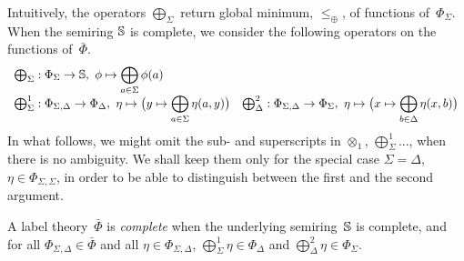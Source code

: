 Intuitively, the operators $\bigoplus_\Sigma$ 
return global minimum, \wrt $\leq_\oplus$, of functions of~$\Phi_\Sigma$. 
%
When the semiring $\mathbb{S}$ is complete, we 
consider the following operators on the functions of~$\bar\Phi$. %
\[
\begin{array}{ll}
\bigoplus_\Sigma : \Phi_\Sigma \to \Semiring,\ 
  \phi \mapsto \displaystyle\bigoplus_{a \in \Sigma} \phi(a)\\
\bigoplus^1_\Sigma : 
  \Phi_{\Sigma,\Delta} \to \Phi_\Delta,\ 
  \eta \mapsto \bigl( y \mapsto \displaystyle\bigoplus_{a \in \Sigma} \eta(a, y) \bigr) &
\bigoplus^2_\Delta : 
  \Phi_{\Sigma,\Delta} \to \Phi_\Sigma,\ 
  \eta \mapsto \bigl( x \mapsto \displaystyle\bigoplus_{b \in \Delta} \eta(x, b) \bigr)\\
\end{array}
\]
%
\medskip\noindent
In what follows, we might omit the sub- and superscripts in 
$\otimes_1$, $\bigoplus^1_\Sigma$..., 
when there is no ambiguity.
We shall keep them only for the special case $\Sigma = \Delta$,
\ie $\eta \in \Phi_{\Sigma, \Sigma}$, %
in order to be able to distinguish between the first and the second argument.
%
\begin{definition}\label{def:label-th-complete}
A label theory~$\bar\Phi$ is \emph{complete} when 
the underlying semiring~$\mathbb{S}$ is complete, and
for all $\Phi_{\Sigma, \Delta} \in \bar\Phi$ 
and all $\eta \in \Phi_{\Sigma, \Delta}$,
$\bigoplus^1_\Sigma \eta \in \Phi_{\Delta}$ and 
$\bigoplus^2_\Delta \eta \in \Phi_{\Sigma}$.
\end{definition}
%

